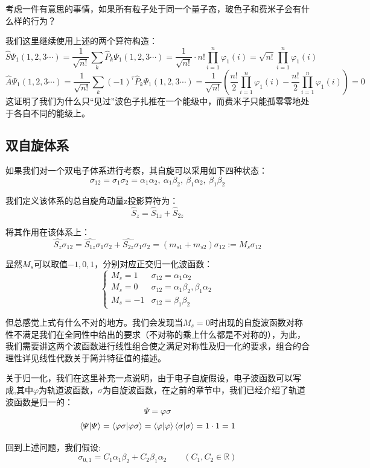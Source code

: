 考虑一件有意思的事情，如果所有粒子处于同一个量子态，玻色子和费米子会有什么样的行为？

我们这里继续使用上述的两个算符构造：
\[\hat{S}\varPsi_{1}(1,2,3 \cdots)=\frac{1}{\sqrt{n!}}\sum_{k}\hat{P}_{k}\varPsi_{1}(1,2,3 \cdots)=\frac{1}{\sqrt{n!}}\cdot n!\prod_{i=1}^n\varphi_1(i)=\sqrt{n!}\prod_{i=1}^n\varphi_1(i)\]
\[\hat{A}\varPsi_{1}(1,2,3 \cdots)=\frac{1}{\sqrt{n!}}\sum_{k}(-1)^{\tau}\hat{P}_{k}\varPsi_{1}(1,2,3 \cdots)=\frac{1}{\sqrt{n!}}\left (\frac{n!}{2}\prod_{i=1}^n\varphi_1(i)-\frac{n!}{2}\prod_{i=1}^n\varphi_1(i) \right )=0\]
这证明了我们为什么只“见过”波色子扎推在一个能级中，而费米子只能孤零零地处于各自不同的能级上。

\subsection{双自旋体系}
如果我们对一个双电子体系进行考察，其自旋可以采用如下四种状态：
\[\sigma_{12}=\sigma_{1}\sigma_{2}=\alpha_1\alpha_2, \ \alpha_1\beta_2, \ \beta_1\alpha_2, \ \beta_1\beta_2\]

我们定义该体系的总自旋角动量z投影算符为：
\[\hat{S}_z=\hat{S}_{1z}+\hat{S}_{2z}\]

将其作用在该体系上：
\[\hat{S_z}\sigma_{12}=\hat{S_{1z}}\sigma_{1}\sigma_{2}+\hat{S_{2z}}\sigma_{1}\sigma_{2}=(m_{s1}+m_{s2})\sigma_{12}:=M_s\sigma_{12}\]

显然$M_s$可以取值$-1,0,1$，分别对应正交归一化波函数：
\[
    \left \{
    \begin{array}{ll}
        M_s=1  & \sigma_{12}=\alpha_1\alpha_2\\
        M_s=0  & \sigma_{12}=\alpha_1\beta_2,\beta_1\alpha_2\\
        M_s=-1 & \sigma_{12}=\beta_1\beta_2
    \end{array}
    \right .
\]

但总感觉上式有什么不对的地方。我们会发现当$M_s=0$时出现的自旋波函数对称性不满足我们在全同性中给出的要求（不对称的乘上什么都是不对称的），为此，我们需要讲这两个波函数进行线性组合使之满足对称性及归一化的要求，组合的合理性详见线性代数关于简并特征值的描述。

关于归一化，我们在这里补充一点说明，由于电子自旋假设，电子波函数可以写成,其中$\varphi$为轨道波函数，$\sigma$为自旋波函数，在之前的章节中，我们已经介绍了轨道波函数是归一的：
\[\varPsi=\varphi\sigma\]
\[\bra{\varPsi}\ket{\varPsi}=\bra{\varphi\sigma}\ket{\varphi\sigma}=\bra{\varphi}\ket{\varphi}\bra{\sigma}\ket{\sigma}=1 \cdot 1=1\]

回到上述问题，我们假设:
\[\sigma_{0,1}=C_1\alpha_1\beta_2+C_2\beta_1\alpha_2 \qquad (C_1,C_2 \in \mathbb{R})\]


